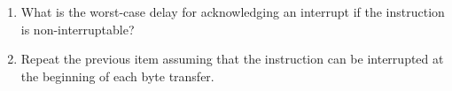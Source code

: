 \documentclass[12pt]{article}
\begin{document}
\begin{enumerate}[itemsep=3em]
\begin{enumerate}[itemsep=3em]
{{			}}
		
			\item{What is the worst-case delay for acknowledging an interrupt if the instruction is non-interruptable?}\\
			\fbox{\parbox{\textwidth}{
			
			}}
		
			\item{Repeat the previous item assuming that the instruction can be interrupted at the beginning of each byte transfer.}\\
			\fbox{\parbox{\textwidth}{
			
			}}

		\end{enumerate}
	\end{enumerate}
\end{document}
